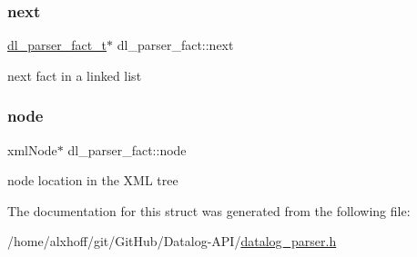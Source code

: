 \subsubsection{\texorpdfstring{next}{next}}
{\footnotesize\ttfamily \hyperlink{datalog__parser_8h_ad97776994371341952d410f045d73e72}{dl\+\_\+parser\+\_\+fact\+\_\+t}$\ast$ dl\+\_\+parser\+\_\+fact\+::next}

next fact in a linked list \mbox{\label{structdl__parser__fact_a1a5d064b161e07cfacedd5cdf871d04f}} 
\subsubsection{\texorpdfstring{node}{node}}
{\footnotesize\ttfamily xml\+Node$\ast$ dl\+\_\+parser\+\_\+fact\+::node}

node location in the X\+ML tree 

The documentation for this struct was generated from the following file\+:\begin{DoxyCompactItemize}
\item 
/home/alxhoff/git/\+Git\+Hub/\+Datalog-\/\+A\+P\+I/\hyperlink{datalog__parser_8h}{datalog\+\_\+parser.\+h}\end{DoxyCompactItemize}
